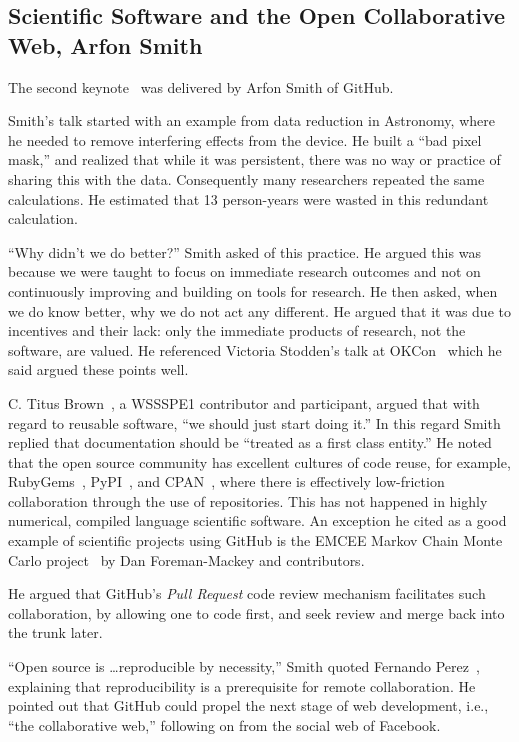\documentclass[11pt, oneside]{amsart}
\begin{document}
\subsection{Scientific Software and the Open Collaborative Web, Arfon Smith} \label{sec:keynote2}

The second keynote~\cite{WSSSPE1-keynote2} was delivered by Arfon
Smith of GitHub.

Smith's talk started with an example from data reduction in Astronomy,
where he needed to remove interfering effects from the device. He
built a ``bad pixel mask,'' and realized that while it was persistent,
there was no way or practice of sharing this with the
data. Consequently many researchers repeated the same calculations. He
estimated that 13 person-years were wasted in this redundant
calculation.

``Why didn't we do better?''  Smith asked of this practice. He argued
this was because we were taught to focus on immediate research
outcomes and not on continuously improving and building on tools for
research. He then asked, when we do know better, why we do not act any
different. He argued that it was due to incentives and their lack:
only the immediate products of research, not the software, are valued.
He referenced Victoria Stodden's talk at
OKCon~\cite{okcon-stodden-talk} which he said argued these points
well.


C. Titus Brown~\cite{ged-web}, a WSSSPE1 contributor and participant,
argued that with regard to reusable software, ``we should just start
doing it.'' In this regard Smith replied that documentation should be
``treated as a first class entity.''  He noted that the open source
community has excellent cultures of code reuse, for example,
RubyGems~\cite{rubygems-web}, PyPI~\cite{pypi-web}, and
CPAN~\cite{cpan-web}, where there is effectively low-friction
collaboration through the use of repositories. This has not happened
in highly numerical, compiled language scientific software.  An
exception he cited as a good example of scientific projects using
GitHub is the EMCEE Markov Chain Monte Carlo project~\cite{emcee-web}
by Dan Foreman-Mackey and contributors.

He argued that GitHub's \emph{Pull Request} code review mechanism
facilitates such collaboration, by allowing one to code first, and
seek review and merge back into the trunk later.

``Open source is \ldots reproducible by necessity,'' Smith quoted
Fernando Perez~\cite{perez-open-src-reproducible}, explaining that
reproducibility is a prerequisite for remote collaboration.  He
pointed out that GitHub could propel the next stage of web
development, i.e., ``the collaborative web,'' following on from the
social web of Facebook.
\end{document}
